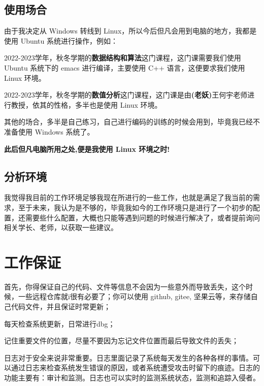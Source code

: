 \documentclass{ctexart}
\begin{document}
\subsection{使用场合}

由于我决定从 Windows 转线到 Linux，所以今后但凡会用到电脑的地方，我都是使用 Ubuntu 系统进行操作，例如：

2022-2023学年，秋冬学期的{\bf 数据结构和算法}这门课程，这门课需要我们使用 Ubuntu 系统下的 emacs 进行编译，主要使用 C++ 语言，这便要求我们使用 Linux 环境。

2022-2023学年，秋冬学期的{\bf 数值分析}这门课程，这门课是由{\bf (老妖)}王何宇老师进行教授，依其的性格，多半也是使用 Linux 环境。

其他的场合，多半是自己练习，自己进行编码的训练的时候会用到，毕竟我已经不准备使用 Windows 系统了。

{\bf 此后但凡电脑所用之处,便是我使用 Linux 环境之时!}

\subsection{分析环境}

我觉得我目前的工作环境足够我现在所进行的一些工作，也就是满足了我当前的需求，至于未来，我认为是不够的，毕竟我如今的工作环境只是进行了一个初步的配置，还需要些什么配置，大概也只能等遇到问题的时候进行解决了，或者提前询问相关学长、老师，以获取一些建议。

\section{工作保证}

首先，你得保证自己的代码、文件等信息不会因为一些意外而导致丢失，这个时候，一些远程仓库就i很有必要了；你可以使用 github, gitee, 坚果云等，来存储自己代码文件，并且保证时常更新；

每天检查系统更新，日常进行dbg；

记住重要文件的位置，尽量不要因为忘记文件位置而最后导致文件的丢失；

日志对于安全来说非常重要。日志里面记录了系统每天发生的各种各样的事情。可以通过日志来检查系统发生错误的原因，或者系统遭受攻击时留下的痕迹。日志的功能主要有：审计和监测。日志也可以实时的监测系统状态，监测和追踪入侵者。\cite{李海涛2008基于}

\newpage



\end{document}

